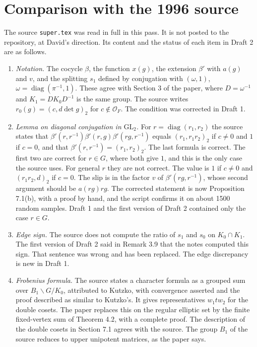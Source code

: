 \documentclass[12pt,letterpaper]{article}
\begin{document}
\section{Comparison with the 1996 source}\label{sec:source}
The source \texttt{super.tex} was read in full in this pass. It is not posted to the repository, at David's direction. Its content and the status of each item in Draft 2 are as follows.
\begin{enumerate}
\item \emph{Notation.} The cocycle $\beta$, the function $x(g)$, the extension $\beta'$ with $a(g)$ and $v$, and the splitting $s_1$ defined by conjugation with $(\omega,1)$, $\omega=\operatorname{diag}(\pi^{-1},1)$. These agree with Section 3 of the paper, where $D=\omega^{-1}$ and $K_1=DK_0D^{-1}$ is the same group. The source writes $r_0(g)=(c,d\det g)_2$ for $c\notin\mathcal O_F$. The condition was corrected in Draft 1.
\item \emph{Lemma on diagonal conjugation in $\mathrm{GL}_2$.} For $r=\operatorname{diag}(r_1,r_2)$ the source states that $\beta'(r,r^{-1})\beta'(r,g)\beta'(rg,r^{-1})$ equals $(r_1,r_1r_2)_2$ if $c\ne0$ and $1$ if $c=0$, and that $\beta'(r,r^{-1})=(r_1,r_2)_2$. The last formula is correct. The first two are correct for $r\in G$, where both give $1$, and this is the only case the source uses. For general $r$ they are not correct. The value is $1$ if $c\ne0$ and $(r_1r_2,d)_2$ if $c=0$. The slip is in the factor $v$ of $\beta'(rg,r^{-1})$, whose second argument should be $a(rg)rg$. The corrected statement is now Proposition 7.1(b), with a proof by hand, and the script confirms it on about 1500 random samples. Draft 1 and the first version of Draft 2 contained only the case $r\in G$.
\item \emph{Edge sign.} The source does not compute the ratio of $s_1$ and $s_0$ on $K_0\cap K_1$. The first version of Draft 2 said in Remark 3.9 that the notes computed this sign. That sentence was wrong and has been replaced. The edge discrepancy is new in Draft 1.
\item \emph{Frobenius formula.} The source states a character formula as a grouped sum over $B_1\backslash G/K_0$, attributed to Kutzko, with convergence asserted and the proof described as similar to Kutzko's. It gives representatives $w_1tw_2$ for the double cosets. The paper replaces this on the regular elliptic set by the finite fixed-vertex sum of Theorem 4.2, with a complete proof. The description of the double cosets in Section 7.1 agrees with the source. The group $B_1$ of the source reduces to upper unipotent matrices, as the paper says.

\end{enumerate}
\end{document}
